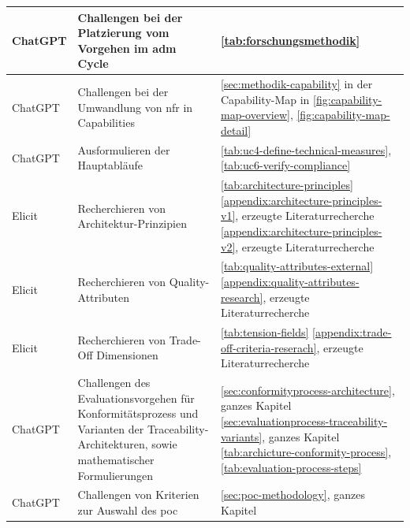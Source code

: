 \begin{longtable}{|
  L{3cm}|
  p{\dimexpr(\textwidth-3cm-6\arrayrulewidth)/2}|
  p{\dimexpr(\textwidth-3cm-6\arrayrulewidth)/2}|
}
    ChatGPT &
    Challengen bei der Platzierung vom Vorgehen im \ac{adm} Cycle & 
    \autoref{tab:forschungsmethodik}
    \\
    \hline

    ChatGPT &
    Challengen bei der Umwandlung von \ac{nfr} in Capabilities & 
    \autoref{sec:methodik-capability} in der Capability-Map in \autoref{fig:capability-map-overview}, \autoref{fig:capability-map-detail}
    \\
    \hline

    ChatGPT &
    Ausformulieren der Hauptabläufe & 
    \autoref{tab:uc4-define-technical-measures}, \autoref{tab:uc6-verify-compliance}
    \\
    \hline

    Elicit &
    Recherchieren von Architektur-Prinzipien &
    \autoref{tab:architecture-principles} \newline 
    \autoref{appendix:architecture-principles-v1}, erzeugte Literaturrecherche \newline
    \autoref{appendix:architecture-principles-v2}, erzeugte Literaturrecherche
    \\
    \hline

    Elicit &
    Recherchieren von Quality-Attributen  & 
    \autoref{tab:quality-attributes-external} \newline
    \autoref{appendix:quality-attributes-research}, erzeugte Literaturrecherche
    \\
    \hline

    Elicit &
    Recherchieren von Trade-Off Dimensionen  & 
    \autoref{tab:tension-fields} \newline
    \autoref{appendix:trade-off-criteria-reserach}, erzeugte Literaturrecherche
    \\
    \hline

    ChatGPT &
    Challengen des Evaluationsvorgehen für Konformitätsprozess und Varianten der Traceability-Architekturen, sowie mathematischer Formulierungen & 
    \autoref{sec:conformityprocess-architecture}, ganzes Kapitel \newline
    \autoref{sec:evaluationprocess-traceability-variants}, ganzes Kapitel \newline
    \autoref{tab:archicture-conformity-process}, \autoref{tab:evaluation-process-steps}
    \\
    \hline

    ChatGPT &
    Challengen von Kriterien zur Auswahl des \ac{poc} & 
    \autoref{sec:poc-methodology}, ganzes Kapitel \newline
    \\
    \hline


\end{longtable}
